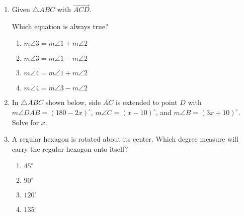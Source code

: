 \begin{enumerate}
\newpage
\item Given $\triangle ABC$ with $\overrightarrow{ACD}$.
  \begin{center}
  \end{center}
  Which equation is always true?
  \begin{multicols}{2}
  \begin{enumerate}
    \item $m\angle 3 = m\angle 1 + m\angle 2$
    \item $m\angle 3 = m\angle 1 - m\angle 2$ 
    \item $m\angle 4 = m\angle 1 + m\angle 2$
    \item $m\angle 4 = m\angle 3 - m\angle 2$
  \end{enumerate}
  \end{multicols}

\item In $\triangle ABC$ shown below, side $\overline{AC}$ is extended to point $D$ with $m\angle DAB=(180-2x)^\circ$, $m\angle C=(x-10)^\circ$, and $m\angle B=(3x+10)^\circ$. Solve for $x$.
  \begin{flushleft}
  \end{flushleft} \vspace{2cm}

\item A regular hexagon is rotated about its center. Which degree measure will carry the regular hexagon onto itself? 
\begin{multicols}{2}
  \begin{enumerate}
    \item $45^\circ$
    \item $90^\circ$
    \item $120^\circ$
    \item $135^\circ$
  \end{enumerate}
\end{multicols}


\end{enumerate}
